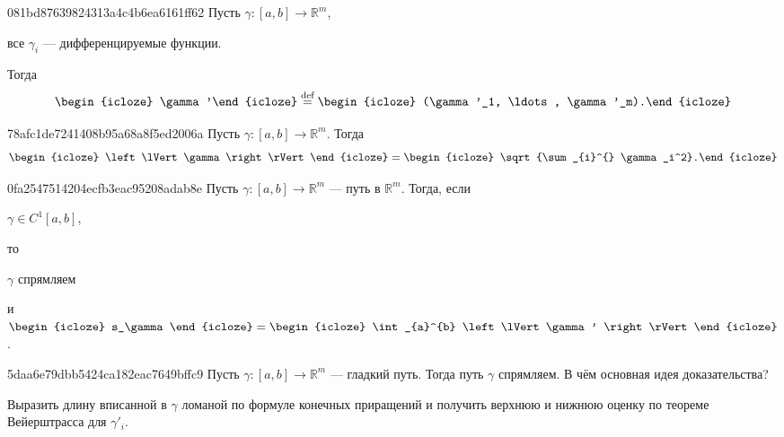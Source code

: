 \begin{note}{081bd87639824313a4c4b6ea6161ff62}
    Пусть \({ \gamma : [a, b] \to \mathbb R^{m} }\),\: \begin{icloze}{3}все \({ \gamma_i }\) --- дифференцируемые функции.\end{icloze}
    Тогда
    \[
        \begin{icloze}{2}\gamma'\end{icloze} \overset{\text{def}}= \begin{icloze}{1}(\gamma'_1, \ldots, \gamma'_m).\end{icloze}
    \]
\end{note}

\begin{note}{78afc1de7241408b95a68a8f5ed2006a}
    Пусть \({ \gamma : [a, b] \to \mathbb R^{m} }\).
    Тогда
    \[
        \begin{icloze}{2}\left\lVert \gamma \right\rVert\end{icloze} = \begin{icloze}{1}\sqrt{\sum_{i}^{} \gamma_i^2}.\end{icloze}
    \]
\end{note}

\begin{note}{0fa2547514204ecfb3eac95208adab8e}
    Пусть \({ \gamma : [a, b] \to \mathbb R^{m} }\) --- путь в \({ \mathbb R^{m} }\).
    Тогда, если \begin{icloze}{4}\({ \gamma \in C^{1}[a, b] }\),\end{icloze} то \begin{icloze}{2}\({ \gamma }\) спрямляем\end{icloze} и
    \({ \begin{icloze}{3}s_\gamma\end{icloze} = \begin{icloze}{1}\int_{a}^{b} \left\lVert \gamma' \right\rVert\end{icloze} }\).
\end{note}

\begin{note}{5daa6e79dbb5424ca182eac7649bffc9}
    Пусть \({ \gamma : [a, b] \to \mathbb R^{m} }\) --- гладкий путь.
    Тогда путь \({ \gamma }\) спрямляем.
    В чём основная идея доказательства?

    \begin{cloze}{1}
        Выразить длину вписанной в \({ \gamma }\) ломаной по формуле конечных приращений и получить верхнюю и нижнюю оценку по теореме Вейерштрасса для \({ \gamma'_i }\).
    \end{cloze}
\end{note}


